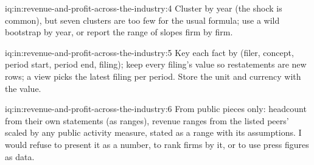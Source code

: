 \begin{solution}{iq:in:revenue-and-profit-across-the-industry:4}
Cluster by year (the shock is common), but seven clusters are too few for the usual formula; use a wild bootstrap by
year, or report the range of slopes firm by firm.
\end{solution}

\begin{solution}{iq:in:revenue-and-profit-across-the-industry:5}
Key each fact by (filer, concept, period start, period end, filing); keep every filing's value so restatements are new
rows; a view picks the latest filing per period. Store the unit and currency with the value.
\end{solution}

\begin{solution}{iq:in:revenue-and-profit-across-the-industry:6}
From public pieces only: headcount from their own statements (as ranges), revenue ranges from the listed peers'
 scaled by any public activity measure, stated as a range with its assumptions. I would refuse to
present it as a number, to rank firms by it, or to use press figures as data.
\end{solution}

